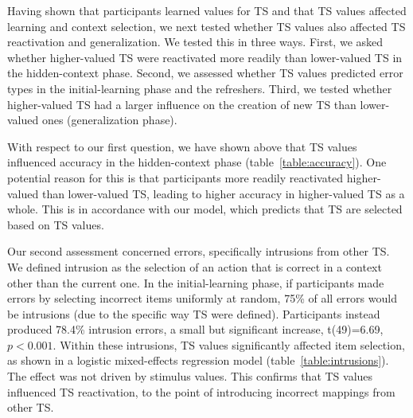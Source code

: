 \documentclass[10pt, letterpaper]{article}
\begin{document}
Having shown that participants learned values for TS and that TS values affected learning and context selection, we next tested whether TS values also affected TS reactivation and generalization. We tested this in three ways. First, we asked whether higher-valued TS were reactivated more readily than lower-valued TS in the hidden-context phase. Second, we assessed whether TS values predicted error types in the initial-learning phase and the refreshers. Third, we tested whether higher-valued TS had a larger influence on the creation of new TS than lower-valued ones (generalization phase).

With respect to our first question, we have shown above that TS values influenced accuracy in the hidden-context phase (table~\ref{table:accuracy}). One potential reason for this is that participants more readily reactivated higher-valued than lower-valued TS, leading to higher accuracy in higher-valued TS as a whole. This is in accordance with our model, which predicts that TS are selected based on TS values.

Our second assessment concerned errors, specifically intrusions from other TS. We defined intrusion as the selection of an action that is correct in a context other than the current one. In the initial-learning phase, if participants made errors by selecting incorrect items uniformly at random, 75\% of all errors would be intrusions (due to the specific way TS were defined). Participants instead produced 78.4\% intrusion errors, a small but significant increase, t(49)=6.69, $p<0.001$. Within these intrusions, TS values significantly affected item selection, as shown in a logistic mixed-effects regression model (table~\ref{table:intrusions}). The effect was not driven by stimulus values. This confirms that TS values influenced TS reactivation, to the point of introducing incorrect mappings from other TS.
\end{document}
